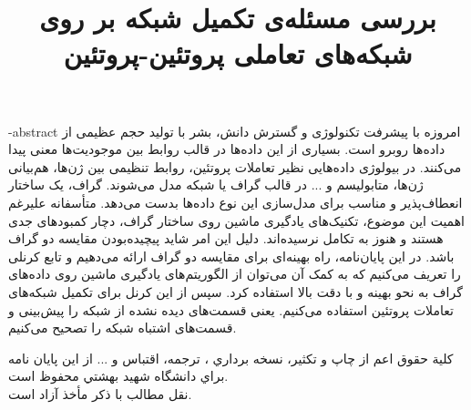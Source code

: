 \subject{علوم کامپیوتر }
\title{بررسی مسئله‌ی تکمیل شبکه بر روی شبکه‌های تعاملی پروتئین-پروتئین}
\fa-abstract{\noindent
امروزه با پیشرفت تکنولوژی و گسترش دانش، بشر با تولید حجم عظیمی از داده‌ها روبرو است. بسیاری از این داده‌ها در قالب روابط بین موجودیت‌ها معنی پیدا می‌کنند. در بیولوژی داده‌هایی نظیر تعاملات پروتئین، روابط تنظیمی بین ژن‌ها، هم‌بیانی ژن‌ها، متابولیسم و ... در قالب گراف یا شبکه مدل می‌شوند. گراف، یک ساختار انعطاف‌پذیر و مناسب برای مدل‌سازی این نوع داده‌ها بدست می‌دهد. متأسفانه علیرغم اهمیت این موضوع، تکنیک‌های یادگیری ماشین روی ساختار گراف، دچار کمبود‌های جدی هستند و هنوز به تکامل نرسیده‌اند. دلیل این امر شاید پیچیده‌بودن مقایسه دو گراف باشد. در این پایان‌نامه، راه بهینه‌ای برای مقایسه دو گراف ارائه می‌دهیم و تابع کرنلی را تعریف می‌کنیم که به کمک آن می‌توان از الگوریتم‌های یادگیری ماشین روی داده‌های گراف به نحو بهینه و با دقت بالا استفاده کرد. سپس از این کرنل برای تکمیل شبکه‌های تعاملات پروتئین استفاده می‌کنیم. یعنی قسمت‌های دیده نشده از شبکه را پیش‌بینی و قسمت‌های اشتباه شبکه را تصحیح می‌کنیم.
}
\newpage
\thispagestyle{empty}
\vtitle
\newpage
\thispagestyle{empty}
\clearpage
~~~
\newpage
\thispagestyle{empty}
\vspace*{5cm}
{\dav
\begin{center}
كلية حقوق اعم از چاپ و تكثير، نسخه برداري ، ترجمه، اقتباس و ... از اين پايان نامه براي دانشگاه شهيد بهشتي محفوظ است.\\
 نقل  مطالب با ذكر مأخذ آزاد است.
\end{center}
}
\newpage
\thispagestyle{empty}
\clearpage
~~~
\newpage
